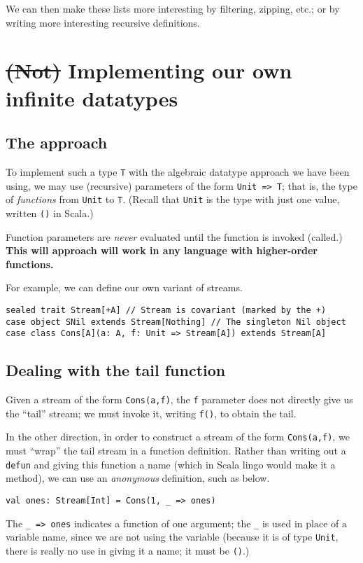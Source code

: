 \documentclass[11pt]{article}
\begin{document}
We can then make these lists more interesting
by filtering, zipping, etc.;
or by writing more interesting recursive definitions.

\section{\sout{(Not)} Implementing our own infinite datatypes}
\label{sec:orgaf2b22a}
\subsection{The approach}
\label{sec:orga7a810f}
To implement such a type \texttt{T} with the algebraic datatype approach
we have been using, we may use (recursive) parameters
of the form \texttt{Unit => T}; that is,
the type of \emph{functions} from \texttt{Unit} to \texttt{T}.
(Recall that \texttt{Unit} is the type with just one value,
written \texttt{()} in Scala.)

Function parameters are \emph{never} evaluated until
the function is invoked (called.)
\textbf{This will approach will work in any language with
higher-order functions.}

For example, we can define our own variant of streams.
\begin{verbatim}
sealed trait Stream[+A] // Stream is covariant (marked by the +)
case object SNil extends Stream[Nothing] // The singleton Nil object
case class Cons[A](a: A, f: Unit => Stream[A]) extends Stream[A]
\end{verbatim}

\subsection{Dealing with the tail function}
\label{sec:org0095745}

Given a stream of the form \texttt{Cons(a,f)},
the \texttt{f} parameter does not directly give us the “tail” stream;
we must invoke it, writing \texttt{f()}, to obtain the tail.

In the other direction,
in order to construct a stream of the form \texttt{Cons(a,f)},
we must “wrap” the tail stream in a function definition.
Rather than writing out a \texttt{defun} and giving this function a name
(which in Scala lingo would make it a method),
we can use an \emph{anonymous} definition,
such as below.
\begin{verbatim}
val ones: Stream[Int] = Cons(1, _ => ones)
\end{verbatim}
The \texttt{\_ => ones} indicates a function of one argument;
the \texttt{\_} is used in place of a variable name,
since we are not using the variable
(because it is of type \texttt{Unit}, there is really no use in
giving it a name; it must be \texttt{()}.)
\end{document}
